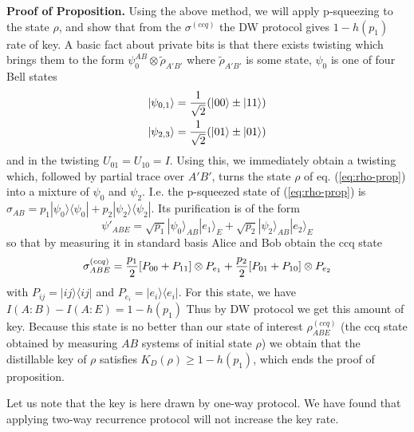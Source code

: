 \documentclass[twocolumn,prl,aps]{revtex4}
\def\be{\begin{equation}}
\def\ee{\end{equation}}
\def\ben{\begin{eqnarray}}
\def\een{\end{eqnarray}}
\def\>{\rangle}
\def\<{\langle}
\def\ot{\otimes}
\def\rhoccqabe{\rho^{(ccq)}_{ABE}}
\def\sigmaccqabe{\sigma^{(ccq)}_{ABE}}
\def\sigmaccq{\sigma^{(ccq)}}
\begin{document}
{\bf Proof  of Proposition.}
Using the above method, we will apply p-squeezing to the state $\rho$, and 
show that from the $\sigmaccq$ the DW protocol gives $1-h(p_1)$ rate of key. 
A basic fact about private bits \cite{pptkey} is that there exists twisting 
which brings them to the form $\psi_0^{AB}\ot \tilde \rho_{A'B'}$
where $\tilde\rho_{A'B'}$ is some state,  $\psi_0$ is one of four Bell states 
\ben
|\psi_{0,1}\> = {1\over \sqrt{2}}(|00\> \pm |11\>) \\
|\psi_{2,3}\> = {1\over \sqrt{2}}(|01\> \pm |01\>)
\een
and in the twisting $U_{01}=U_{10}=I$. 
Using this, we immediately obtain a twisting which, followed by 
partial trace over $A'B'$, turns the state $\rho$ 
of eq. (\ref{eq:rho-prop}) into a mixture of $\psi_0$ and $\psi_2$. 
 I.e. the p-squeezed state of (\ref{eq:rho-prop}) is $\sigma_{AB} = p_1 |\psi_0\>\<\psi_0| + p_2 |\psi_2\>\<\psi_2| $. 
Its purification is of the form 
\be
\psi'_{ABE}= \sqrt{p_1}|\psi_0\>_{AB}|e_1\>_{E} + \sqrt{p_2}|\psi_2\>_{AB}|e_2\>_{E}
\label{psqueezed}
\ee
so that by measuring it in  standard basis Alice and Bob obtain the ccq state
\be
\sigmaccqabe = {p_1\over 2}[P_{00} + P_{11}]\ot P_{e_1} + 
{p_2\over 2}[P_{01} + P_{10}]\ot P_{e_2}
\ee
with $P_{ij}=|ij\>\<ij|$ and $P_{e_i}=|e_i\>\<e_i|$.
For this state, we have $I(A:B)-I(A:E)= 1-h(p_1)$ Thus by DW protocol \cite{DevetakWinter-hash}
we get this amount of key.
Because this state is no better than our state of interest $\rhoccqabe$
(the ccq state obtained by measuring $AB$ systems of initial state $\rho$)
we obtain that the distillable key of $\rho$ satisfies $K_D(\rho)\geq 1-h(p_1)$, 
which ends the proof of proposition. 
 
Let us note that the key is here drawn by one-way protocol. We have found that 
applying two-way recurrence protocol will not increase the key rate. 
\end{document}
